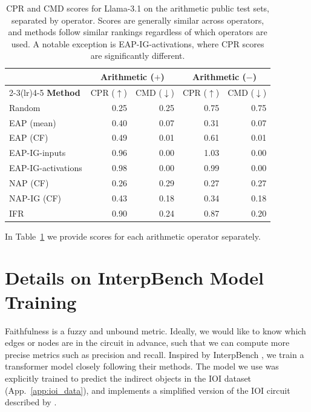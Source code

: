 \documentclass{article}
\theoremstyle{plain}
\theoremstyle{definition}
\theoremstyle{remark}
\begin{document}
\begin{table}
    \centering
    \caption{\textsf{CPR} and \textsf{CMD} scores for Llama-3.1 on the arithmetic public test sets, separated by operator. Scores are generally similar across operators, and methods follow similar rankings regardless of which operators are used. A notable exception is EAP-IG-activations, where \textsf{CPR} scores are significantly different.}
    \begin{tabular}{lrrrr}
    \toprule
    & \multicolumn{2}{c}{Arithmetic ($+$)} & \multicolumn{2}{c}{Arithmetic ($-$)} \\\cmidrule(lr){2-3}\cmidrule(lr){4-5}
    \textbf{Method} & \textsf{CPR} ($\uparrow$) & \textsf{CMD} ($\downarrow$) & \textsf{CPR} ($\uparrow$) & \textsf{CMD} ($\downarrow$) \\
    \midrule
    Random & 0.25 & 0.25 & 0.75 & 0.75  \\
    \midrule
    EAP (mean) & 0.40 & 0.07 & 0.31 & 0.07 \\
    EAP (CF) & 0.49 & 0.01 & 0.61 & 0.01 \\
    \midrule
    EAP-IG-inputs & 0.96 & 0.00 & 1.03 & 0.00 \\
    EAP-IG-activations & 0.98 & 0.00 & 0.99 & 0.00 \\
    \midrule
    NAP (CF) & 0.26 & 0.29 & 0.27 & 0.27 \\
    NAP-IG (CF) & 0.43 & 0.18 & 0.34 & 0.18 \\
    \midrule
    IFR & 0.90 & 0.24 & 0.87 & 0.20 \\
    \bottomrule
    \end{tabular}
    \label{tab:circuit_arithmetic}
\end{table}


In Table~\ref{tab:circuit_arithmetic} we provide scores for each arithmetic operator separately. 

\section{Details on InterpBench Model Training}
\label{app:interpbench}

Faithfulness is a fuzzy and unbound metric. Ideally, we would like to know which edges or nodes are in the circuit in advance, such that we can compute more precise metrics such as precision and recall. Inspired by InterpBench \citep{gupta2024interpbench}, we train a transformer model closely following their methods. The model we use was explicitly trained to predict the indirect objects in the IOI dataset (App.~\ref{app:ioi_data}), 
and implements a simplified version of the IOI circuit described by \citet{gupta2024interpbench}.
\end{document}
